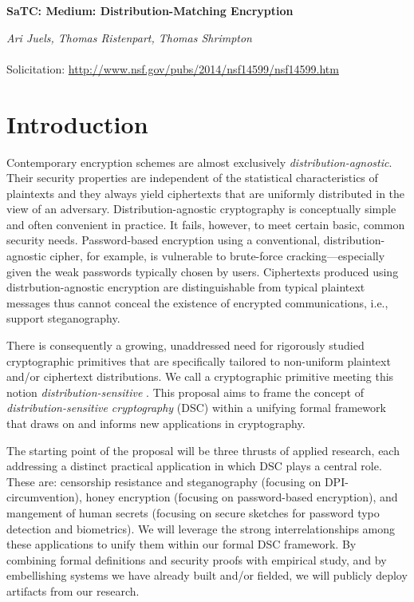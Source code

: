 \documentclass[10pt]{article}
\newcommand{\mytitle}{SaTC: Medium: Distribution-Matching Encryption}
\begin{document}
\vspace*{1.0in}
\begin{center}


{\Large\bf \mytitle}

\vspace*{.5in}

{\large
  {\em  Ari Juels, Thomas Ristenpart, Thomas Shrimpton}
}
\\ \hfill \\
Solicitation: \url{http://www.nsf.gov/pubs/2014/nsf14599/nsf14599.htm}


\end{center}
\thispagestyle{plain}


\clearpage
\renewcommand{\thepage}{D-\arabic{page}}
\setcounter{page}{1}

\section{Introduction}
\label{sec:intro}

Contemporary encryption schemes are almost exclusively {\em distribution-agnostic}. Their security properties are independent of the statistical characteristics of plaintexts and they always yield ciphertexts that are uniformly distributed in the view of an adversary. Distribution-agnostic cryptography is conceptually simple and often convenient in practice. It fails, however, to meet certain basic, common security needs. Password-based encryption using a conventional, distribution-agnostic cipher, for example, is vulnerable to brute-force cracking---especially given the weak passwords typically chosen by users. Ciphertexts produced using distrbution-agnostic encryption are distinguishable from typical plaintext messages thus cannot conceal the existence of encrypted communications, i.e., support steganography. 

There is consequently a growing, unaddressed need for rigorously studied cryptographic primitives that are specifically tailored to non-uniform plaintext and/or ciphertext distributions. We call a cryptographic primitive meeting this notion {\em distribution-sensitive} . This proposal aims to frame the concept of {\em distribution-sensitive cryptography} (DSC) within a unifying formal framework that draws on and informs new applications in cryptography.

The starting point of the proposal will be three thrusts of applied research, each addressing a distinct practical application in which DSC plays a central role. These are: censorship resistance and steganography (focusing on DPI-circumvention), honey encryption (focusing on password-based encryption), and mangement of human secrets (focusing on secure sketches for password typo detection and biometrics). We will leverage the strong interrelationships among these applications to unify them within our formal DSC framework. By combining formal definitions and security proofs with empirical study, and by embellishing systems we have already built and/or fielded, we will publicly deploy artifacts from our research.
\end{document}
